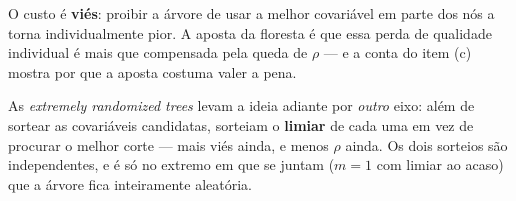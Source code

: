 \documentclass[11pt,a4paper]{article}
\begin{document}
\begin{solucao}
O custo é \textbf{viés}: proibir a árvore de usar a melhor covariável em parte
dos nós a torna individualmente pior. A aposta da floresta é que essa perda de
qualidade individual é mais que compensada pela queda de $\rho$ --- e a conta
do item (c) mostra por que a aposta costuma valer a pena.

As \emph{extremely randomized trees} levam a ideia adiante por \emph{outro} eixo:
além de sortear as covariáveis candidatas, sorteiam o \textbf{limiar} de cada uma
em vez de procurar o melhor corte --- mais viés ainda, e menos $\rho$ ainda. Os
dois sorteios são independentes, e é só no extremo em que se juntam ($m=1$ com
limiar ao acaso) que a árvore fica inteiramente aleatória.
\end{solucao}
\end{document}
